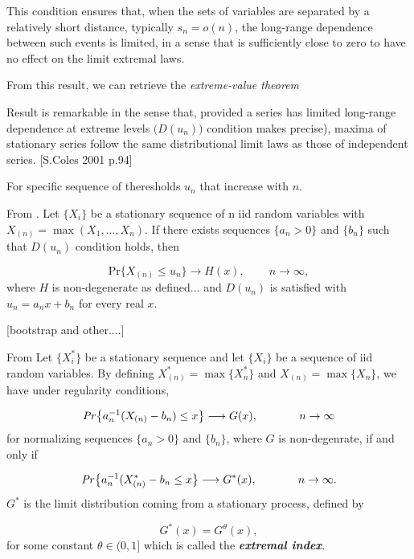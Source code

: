 This condition ensures that, when the sets of variables are separated by a relatively short distance, typically $s_n=o(n)$, the long-range dependence between such events is limited, in a sense that is sufficiently close to zero to have no effect on the limit extremal laws.

From this result, we can retrieve the \emph{extreme-value theorem}

Result is remarkable in the sense that, provided a series has limited long-range dependence at extreme levels $\big(D(u_n)\big)$ condition makes precise), maxima of stationary series follow the same distributional limit laws as those of independent series. [S.Coles 2001 p.94] 

For specific sequence of theresholds $u_n$ that increase with $n$.

\begin{theorem}
	From \cite{leadbetter_extreme_1974}. 
	Let $\{X_i\}$ be a stationary sequence of n iid random variables with $X_{(n)}=\max (X_1,\dots, X_n)$. If there exists sequences $\{a_n>0\}$ and $\{b_n\}$ such that $D(u_n)$ condition holds, then 
	
	\begin{equation}
	\text{Pr}\{X_{(n)}\leq u_n\}\longrightarrow H(x), \ \ \ \ \ \ \ \, \ \ n\rightarrow\infty,
	\end{equation}
	where $H$ is non-degenerate as defined... and $D(u_n)$ is satisfied with $u_n=a_nx+b_n$ for every real $x$. 
	
\end{theorem}

[bootstrap and other....]


\begin{theorem}[Leadbetter 1983]
	From \cite[pp.]{coles_introduction_2001} 
	Let $\{X^*_i\}$ be a stationary sequence and let $\{X_i\}$ be a sequence of iid random variables. By defining  $X^*_{(n)}=\max  \{X^*_n\}$ and $X_{(n)}=\max \{X_n\}$, we have under regularity conditions, 
	
	\begin{equation*}
	\text{\emph{Pr}}\big\{a_n^{-1}(X_{(n)}-b_n)\leq x\big\}\longrightarrow G(x), \ \ \ \ \ \ \ \ \ \ \ n\rightarrow \infty
	\end{equation*}
	for normalizing sequences $\{a_n>0\}$ and $\{b_n\}$, where $G$ is non-degenrate, if and only if 
	
	\begin{equation*}\label{extremindex}
	\text{\emph{Pr}}\big\{a_n^{-1}(X^*_{(n)}-b_n\leq x \big\}\longrightarrow G^*(x), \ \ \ \ \ \ \ \ \ \ \  n\rightarrow\infty.
	\end{equation*}
	$G^*$ is the limit distribution coming from a stationary process, defined by
	
	\begin{equation}\label{extindex}
	G^*(x)=G^{\theta}(x),
	\end{equation}
	for some constant $\theta\in (0,1]$ which is called the \emph{\textbf{extremal index}}.
	
\end{theorem}

